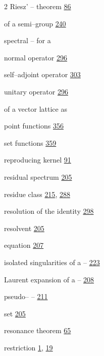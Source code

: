 \begin{multicols}{2}
\hspace*{1.1em}Riesz' -- theorem \hyperlink{page.86}{86}\par
\hspace*{1.1em}of a semi--group \hyperlink{page.240}{240}\par
\hspace*{1.1em}spectral -- for a\par
\hspace*{2.2em}normal operator \hyperlink{page.296}{296}\par
\hspace*{2.2em}self--adjoint operator \hyperlink{page.303}{303}\par
\hspace*{2.2em}unitary operator \hyperlink{page.296}{296}\par
\hspace*{1.1em}of a vector lattice as\par
\hspace*{2.2em}point functions \hyperlink{page.356}{356}\par
\hspace*{2.2em}set functions \hyperlink{page.359}{359}\par
\noindent reproducing kernel \hyperlink{page.91}{91}\par
\noindent residual spectrum \hyperlink{page.205}{205}\par
\noindent residue class \hyperlink{page.215}{215}, \hyperlink{page.288}{288}\par
\noindent resolution of the identity \hyperlink{page.298}{298}\par
\noindent resolvent \hyperlink{page.205}{205}\par
\hspace*{1.1em}equation \hyperlink{page.207}{207}\par
\hspace*{1.1em}isolated singularities of a -- \hyperlink{page.223}{223}\par
\hspace*{1.1em}Laurent expansion of a -- \hyperlink{page.208}{208}\par
\hspace*{1.1em}pseudo-- -- \hyperlink{page.211}{211}\par
\hspace*{1.1em}set \hyperlink{page.205}{205}\par
\noindent resonance theorem \hyperlink{page.65}{65}\par
\noindent restriction \hyperlink{page.1}{1}, \hyperlink{page.19}{19}\par

\end{multicols}
